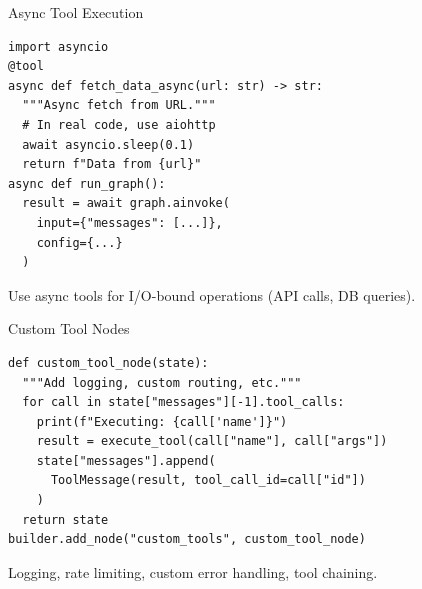 \documentclass[aspectratio=169,11pt]{beamer}
\begin{document}
\begin{frame}[fragile]{Async Tool Execution}
  \begin{codebox}
    \begin{lstlisting}
import asyncio
@tool
async def fetch_data_async(url: str) -> str:
  """Async fetch from URL."""
  # In real code, use aiohttp
  await asyncio.sleep(0.1)
  return f"Data from {url}"
async def run_graph():
  result = await graph.ainvoke(
    input={"messages": [...]},
    config={...}
  )
    \end{lstlisting}
  \end{codebox}
  \vspace{0.1cm}
  \begin{tipbox}
    Use async tools for I/O-bound operations (API calls, DB queries).
  \end{tipbox}
\end{frame}

\begin{frame}[fragile]{Custom Tool Nodes}
  \begin{codebox}
    \begin{lstlisting}
def custom_tool_node(state):
  """Add logging, custom routing, etc."""
  for call in state["messages"][-1].tool_calls:
    print(f"Executing: {call['name']}")
    result = execute_tool(call["name"], call["args"])
    state["messages"].append(
      ToolMessage(result, tool_call_id=call["id"])
    )
  return state
builder.add_node("custom_tools", custom_tool_node)
    \end{lstlisting}
  \end{codebox}
  \vspace{0.1cm}
  \begin{tipbox}
    Logging, rate limiting, custom error handling, tool chaining.
  \end{tipbox}
\end{frame}
\end{document}

